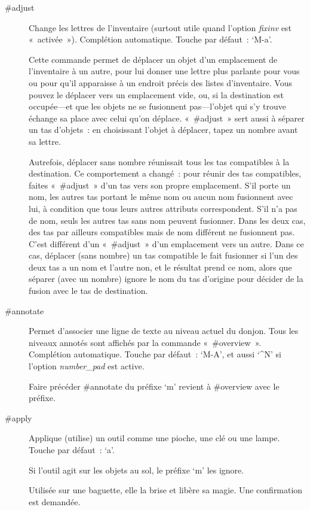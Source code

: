 \documentclass[titlepage]{article}
\begin{document}
\begin{description}
\item[{\#adjust}]
Change les lettres de l'inventaire (surtout utile quand l'option
\textit{fixinv}
est «~activée~»).
Complétion automatique.
Touche par défaut~: `M-a'.


Cette commande permet de déplacer un objet d'un emplacement de
l'inventaire à un autre, pour lui donner une lettre plus parlante pour
vous ou pour qu'il apparaisse à un endroit précis des listes d'inventaire.
Vous pouvez le déplacer vers un emplacement vide, ou, si la destination
est occupée---et que les objets ne se fusionnent pas---l'objet qui s'y
trouve échange sa place avec celui qu'on déplace.
«~\#adjust~» sert aussi à séparer un tas d'objets~: en choisissant
l'objet à déplacer, tapez un nombre avant sa lettre.


Autrefois, déplacer sans nombre réunissait tous les tas compatibles à la
destination.
Ce comportement a changé~: pour réunir des tas compatibles, faites
«~\#adjust~» d'un tas vers son propre emplacement.
S'il porte un nom, les autres tas portant le même nom ou aucun nom
fusionnent avec lui, à condition que tous leurs autres attributs
correspondent.
S'il n'a pas de nom, seuls les autres tas sans nom peuvent fusionner.
Dans les deux cas, des tas par ailleurs compatibles mais de nom différent
ne fusionnent pas.
C'est différent d'un «~\#adjust~» d'un emplacement vers un autre.
Dans ce cas, déplacer (sans nombre) un tas compatible le fait fusionner si
l'un des deux tas a un nom et l'autre non, et le résultat prend ce nom,
alors que séparer (avec un nombre) ignore le nom du tas d'origine pour
décider de la fusion avec le tas de destination.

\item[{\#annotate}]
Permet d'associer une ligne de texte au niveau actuel du donjon.
Tous les niveaux annotés sont affichés par la commande
«~\#overview~».
Complétion automatique.
Touche par défaut~: `M-A', et aussi `\textasciicircum{}N' si l'option
\textit{number\_pad}
est active.


Faire précéder \#annotate du préfixe `m' revient à \#overview avec le
préfixe.

\item[{\#apply}]
Applique (utilise) un outil comme une pioche, une clé ou une lampe.
Touche par défaut~: `a'.


Si l'outil agit sur les objets au sol, le préfixe `m' les ignore.


Utilisée sur une baguette, elle la brise et libère sa magie.
Une confirmation est demandée.


\end{description}
\end{document}
